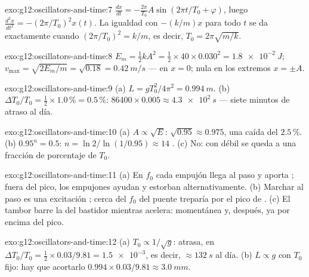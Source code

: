 \begin{solution}{exo:g12:oscillators-and-time:7}
$\frac{dx}{dt} = -\frac{2\pi}{T_0}A\sin(2\pi t/T_0 + \varphi)$, luego
$\frac{d^2x}{dt^2} = -(2\pi/T_0)^2 x(t)$. La igualdad con $-(k/m)x$ para
todo $t$ se da exactamente cuando $(2\pi/T_0)^2 = k/m$, es decir,
$T_0 = 2\pi\sqrt{m/k}$.
\end{solution}

\begin{solution}{exo:g12:oscillators-and-time:8}
$E_m = \tfrac12 kA^2 = \tfrac12 \times 40 \times 0.030^2 =
\qty{1.8e-2}{J}$; $v_{\max} = \sqrt{2E_m/m} = \sqrt{0.18} =
\qty{0.42}{m/s}$ --- en $x = 0$; nula en los extremos $x = \pm A$.
\end{solution}

\begin{solution}{exo:g12:oscillators-and-time:9}
(a) $L = gT_0^2/4\pi^2 = \qty{0.994}{m}$. (b)
$\Delta T_0/T_0 = \tfrac12 \times 1.0\,\% = 0.5\,\%$:
$86400 \times 0.005 \approx \qty{4.3e2}{s}$ --- siete minutos de atraso
al día.
\end{solution}

\begin{solution}{exo:g12:oscillators-and-time:10}
(a) $A \propto \sqrt{E}$: $\sqrt{0.95} \approx 0.975$, una caída del
$2.5\,\%$. (b) $0.95^n = 0.5$: $n = \ln 2/\ln(1/0.95) \approx 14$
. (c) No: con  débil se queda a una fracción de
porcentaje de $T_0$.
\end{solution}

\begin{solution}{exo:g12:oscillators-and-time:11}
(a) En $f_0$ cada empujón llega al paso y aporta ; fuera del
pico, los empujones ayudan y estorban alternativamente. (b) Marchar al
paso es una excitación ; cerca del $f_0$ del puente treparía
por el pico de . (c) El tambor barre la  del
bastidor mientras acelera:  momentánea y, después, ya por
encima del pico.
\end{solution}

\begin{solution}{exo:g12:oscillators-and-time:12}
(a) $T_0 \propto 1/\sqrt{g}$: atrasa, en
$\Delta T_0/T_0 = \tfrac12 \times 0.03/9.81 = \num{1.5e-3}$, es decir,
$\approx \qty{132}{s}$ al día. (b) $L \propto g$ con $T_0$ fijo: hay que
acortarlo $0.994 \times 0.03/9.81 \approx \qty{3.0}{mm}$.
\end{solution}

